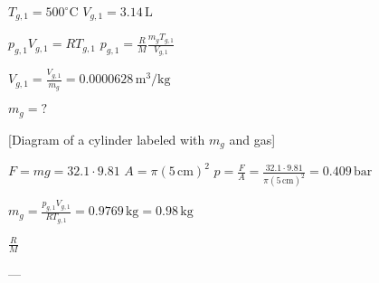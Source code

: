 \( T_{g,1} = 500^\circ \text{C} \)  
\( V_{g,1} = 3.14 \, \text{L} \)  

\( p_{g,1} V_{g,1} = R T_{g,1} \)  
\( p_{g,1} = \frac{R}{M} \frac{m_g T_{g,1}}{V_{g,1}} \)  

\( V_{g,1} = \frac{V_{g,1}}{m_g} = 0.0000628 \, \text{m}^3/\text{kg} \)  

\( m_g = ? \)  

[Diagram of a cylinder labeled with \( m_g \) and gas]  

\( F = m g = 32.1 \cdot 9.81 \)  
\( A = \pi (5 \, \text{cm})^2 \)  
\( p = \frac{F}{A} = \frac{32.1 \cdot 9.81}{\pi (5 \, \text{cm})^2} = 0.409 \, \text{bar} \)  

\( m_g = \frac{p_{g,1} V_{g,1}}{R T_{g,1}} = 0.9769 \, \text{kg} = 0.98 \, \text{kg} \)  

\( \frac{R}{M} \)  

---